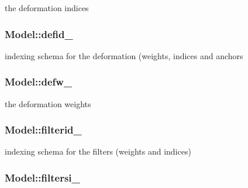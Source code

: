 the deformation indices 

\hypertarget{classModel_a381f13c9035313ffd1cb67e07a2e84bd}{
\subsubsection[{defid\-\_\-}]{ Model\-::defid\-\_\-\hspace{0.3cm}{\ttfamily [protected]}}}\label{classModel_a381f13c9035313ffd1cb67e07a2e84bd}


indexing schema for the deformation (weights, indices and anchors 

\hypertarget{classModel_a1e1fba557437a9f4c0ef1535a64d83f2}{
\subsubsection[{defw\-\_\-}]{ Model\-::defw\-\_\-\hspace{0.3cm}{\ttfamily [protected]}}}\label{classModel_a1e1fba557437a9f4c0ef1535a64d83f2}


the deformation weights 

\hypertarget{classModel_a08e65111230ab010535cc9485dfd6d0d}{
\subsubsection[{filterid\-\_\-}]{ Model\-::filterid\-\_\-\hspace{0.3cm}{\ttfamily [protected]}}}\label{classModel_a08e65111230ab010535cc9485dfd6d0d}


indexing schema for the filters (weights and indices) 

\hypertarget{classModel_ab3f13d90cc96c70d4b454db12528f85f}{
\subsubsection[{filtersi\-\_\-}]{ Model\-::filtersi\-\_\-\hspace{0.3cm}{\ttfamily [protected]}}}\label{classModel_ab3f13d90cc96c70d4b454db12528f85f}


